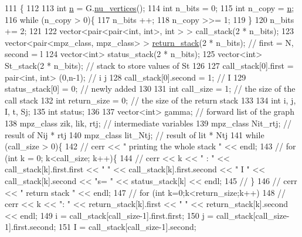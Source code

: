 \begin{DoxyCode}
111 \{
112 
113   \textcolor{keywordtype}{int} \hyperlink{classgraph__encoder_a7fedc9ace19e34abb32f1851c8597591}{n} = G.\hyperlink{classgraph_a70a6e0e4e0a874ab122405abd38f83cd}{nu\_vertices}();
114   \textcolor{keywordtype}{int} n\_bits = 0;
115   \textcolor{keywordtype}{int} n\_copy = \hyperlink{classgraph__encoder_a7fedc9ace19e34abb32f1851c8597591}{n};
116   \textcolor{keywordflow}{while} (n\_copy > 0)\{
117     n\_bits ++;
118     n\_copy >>= 1;
119   \}
120   n\_bits += 2;
121 
122   vector<pair<pair<int, int>, \textcolor{keywordtype}{int} > > call\_stack(2 * n\_bits);
123   vector<pair<mpz\_class, mpz\_class> > \hyperlink{namespacehelper__vars_a36577c81e805c58ec2ec7ed63882317f}{return\_stack}(2 * n\_bits); \textcolor{comment}{// first = N, second = l}
124   vector<int> status\_stack(2 * n\_bits);
125   vector<int> St\_stack(2 * n\_bits); \textcolor{comment}{// stack to store values of St}
126 
127   call\_stack[0].first = pair<int, int> (0,n-1); \textcolor{comment}{// i j }
128   call\_stack[0].second = 1; \textcolor{comment}{// I}
129   status\_stack[0] = 0; \textcolor{comment}{// newly added}
130 
131   \textcolor{keywordtype}{int} call\_size = 1; \textcolor{comment}{// the size of the call stack}
132   \textcolor{keywordtype}{int} return\_size = 0; \textcolor{comment}{// the size of the return stack}
133 
134   \textcolor{keywordtype}{int} i, j, I, t, Sj;
135   \textcolor{keywordtype}{int} status;
136 
137   vector<int> gamma; \textcolor{comment}{// forward list  of the graph}
138   mpz\_class zik, lik, rtj; \textcolor{comment}{// intermediate variables}
139   mpz\_class Nit\_rtj; \textcolor{comment}{// result of Nij * rtj}
140   mpz\_class lit\_Ntj; \textcolor{comment}{// result of lit * Ntj }
141   \textcolor{keywordflow}{while} (call\_size > 0)\{
142     \textcolor{comment}{// cerr << " printing the whole stack " << endl;}
143     \textcolor{comment}{// for (int k = 0; k<call\_size; k++)\{}
144     \textcolor{comment}{//   cerr << k << " : " << call\_stack[k].first.first << " " << call\_stack[k].first.second << " I " <<
       call\_stack[k].second << "s= " << status\_stack[k] << endl;}
145     \textcolor{comment}{// \}}
146     \textcolor{comment}{// cerr << " return stack " << endl;}
147     \textcolor{comment}{// for (int k=0;k<return\_size;k++)}
148     \textcolor{comment}{//   cerr << k << ": " << return\_stack[k].first << " " << return\_stack[k].second << endl;}
149     i = call\_stack[call\_size-1].first.first;
150     j = call\_stack[call\_size-1].first.second;
151     I = call\_stack[call\_size-1].second;

\end{DoxyCode}
